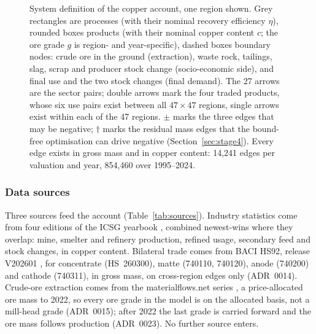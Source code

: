 \begin{figure}[t]
{}
\caption{System definition of the copper account, one region shown. Grey
rectangles are processes (with their nominal recovery efficiency $\eta$),
rounded boxes products (with their nominal copper content $c$; the ore grade
$g$ is region- and year-specific), dashed boxes boundary nodes: crude ore in
the ground (extraction), waste rock, tailings, slag, scrap and producer stock
change (socio-economic side), and final use and the two stock changes (final
demand). The 27 arrows are the sector pairs; double arrows mark the four
traded products, whose six use pairs exist between all $47 \times 47$
regions, single arrows exist within each of the 47 regions. $\pm$ marks the
three edges that may be negative; $\dagger$ marks the residual mass edges
that the bound-free optimisation can drive negative
(Section~\ref{sec:stage4}). Every edge exists in gross mass and in copper
content: 14{,}241 edges per valuation and year, 854{,}460 over 1995--2024.}
\label{fig:system}
\end{figure}

\subsubsection{Data sources}\label{sec:sources}

Three sources feed the account (Table~\ref{tab:sources}). Industry
statistics come from four editions of the ICSG yearbook
\citep{icsg2005yearbook, icsg2014yearbook, icsg2023yearbook,
icsg2025yearbook}, combined newest-wins where they overlap: mine, smelter
and refinery production, refined usage, secondary feed and stock changes, in
copper content. Bilateral trade comes from BACI HS92, release V202601
\citep{gaulier2010baci, cepii2026baci}, for concentrate (HS~260300), matte
(740110, 740120), anode (740200) and cathode (740311), in gross mass, on
cross-region edges only (ADR~0014). Crude-ore extraction comes from the
materialflows.net series \citep{kroiss2024crudeore}, a price-allocated ore
mass to 2022, so every ore grade in the model is on the allocated basis, not
a mill-head grade (ADR~0015); after 2022 the last grade is carried forward
and the ore mass follows production (ADR~0023). No further source enters.

